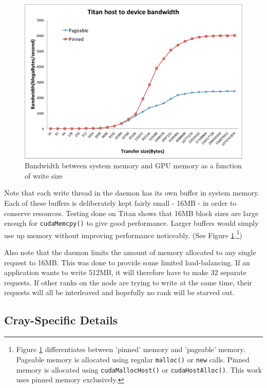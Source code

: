 \begin{figure}
\includegraphics[width=\linewidth]{figures/Host2Device_BW.pdf}
\caption{Bandwidth between system memory and GPU memory as a function of write size\cite{ac_guide}} 
\label{fig:transfer_bw}
\end{figure}

Note that each write thread in the daemon has its own buffer in system memory.  Each of these buffers is deliberately kept fairly small - 16MB - in order to conserve resources.  Testing done on Titan shows that 16MB block sizes are large enough for \texttt{cudaMemcpy()} to give good performance.\cite{ac_guide} Larger buffers would simply use up memory without improving performance noticeably. (See Figure \ref{fig:transfer_bw}.\footnote{Figure \ref{fig:transfer_bw} differentiates between 'pinned' memory and 'pageable' memory.  Pageable memory is allocated using regular \texttt{malloc()} or \texttt{new} calls.  Pinned memory is allocated using \texttt{cudaMallocHost()} or \texttt{cudaHostAlloc()}.\cite{cuda_pinned_memory}  This work uses pinned memory exclusively.})

Also note that the daemon limits the amount of memory allocated to any single request to 16MB.  This was done to provide some limited load-balancing.  If an application wants to write 512MB, it will therefore have to make 32 separate requests.  If other ranks on the node are trying to write at the same time, their requests will all be interleaved and hopefully no rank will be starved out.


\subsection{Cray-Specific Details}
\label{subsec:cray-specific}

